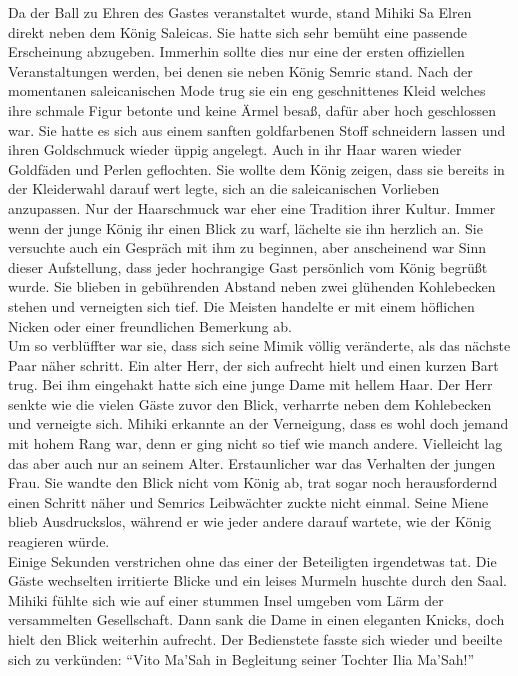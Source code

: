 Da der Ball zu Ehren des Gastes veranstaltet wurde, stand Mihiki Sa Elren direkt neben dem König 
Saleicas. Sie hatte sich sehr bemüht eine passende Erscheinung abzugeben. Immerhin sollte dies nur 
eine der ersten offiziellen Veranstaltungen werden, bei denen sie neben König Semric stand. Nach 
der momentanen saleicanischen Mode trug sie ein eng geschnittenes Kleid welches ihre schmale Figur 
betonte und keine Ärmel besaß, dafür aber hoch geschlossen war. Sie hatte es sich aus einem sanften 
goldfarbenen Stoff schneidern lassen und ihren Goldschmuck wieder üppig angelegt. Auch in ihr Haar 
waren wieder Goldfäden und Perlen geflochten. Sie wollte dem König zeigen, dass sie bereits in der 
Kleiderwahl darauf wert legte, sich an die saleicanischen Vorlieben anzupassen. Nur der Haarschmuck 
war eher eine Tradition ihrer Kultur. Immer wenn der junge König ihr einen Blick zu warf, lächelte 
sie ihn herzlich an. Sie versuchte auch ein Gespräch mit ihm zu beginnen, aber anscheinend war Sinn 
dieser Aufstellung, dass jeder hochrangige Gast persönlich vom König begrüßt wurde. Sie blieben in 
gebührenden Abstand neben zwei glühenden Kohlebecken stehen und verneigten sich tief. Die Meisten 
handelte er mit einem höflichen Nicken oder einer freundlichen Bemerkung ab.\\
Um so verblüffter war sie, dass sich seine Mimik völlig veränderte, als das nächste Paar näher 
schritt. Ein alter Herr, der sich aufrecht hielt und einen kurzen Bart trug. Bei ihm eingehakt 
hatte sich eine junge Dame mit hellem Haar. Der Herr senkte wie die vielen Gäste zuvor den Blick, 
verharrte neben dem Kohlebecken und verneigte sich. Mihiki erkannte an der Verneigung, dass es wohl 
doch jemand mit hohem Rang war, denn er ging nicht so tief wie manch andere. Vielleicht lag das 
aber auch nur an seinem Alter. Erstaunlicher war das Verhalten der jungen Frau. Sie wandte den 
Blick nicht vom König ab, trat sogar noch herausfordernd einen Schritt näher und Semrics 
Leibwächter zuckte nicht einmal. Seine Miene blieb Ausdruckslos, während er wie jeder andere 
darauf wartete, wie der König reagieren würde.\\ 
Einige Sekunden verstrichen ohne das einer der Beteiligten irgendetwas tat. Die Gäste wechselten 
irritierte Blicke und ein leises Murmeln huschte durch den Saal. Mihiki fühlte sich wie auf einer 
stummen Insel umgeben vom Lärm der versammelten Gesellschaft. Dann sank die Dame in einen eleganten 
Knicks, doch hielt den Blick weiterhin aufrecht. Der Bedienstete fasste sich wieder und beeilte sich zu 
verkünden: ``Vito Ma'Sah in Begleitung seiner Tochter Ilia Ma'Sah!''\\
